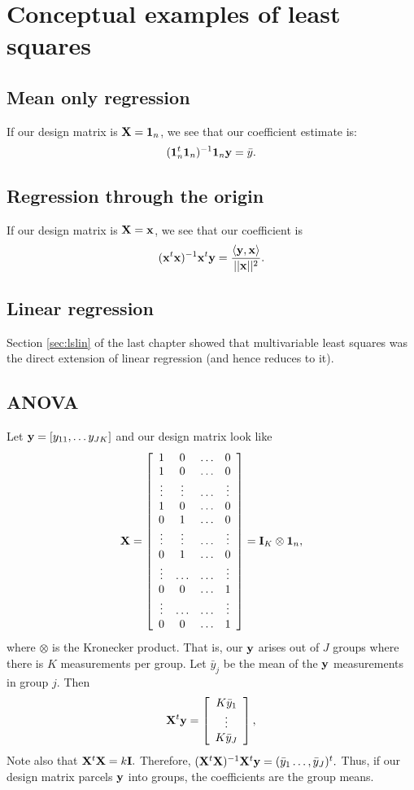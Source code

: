\chapter{Conceptual examples of least squares}

\section{Mean only regression}
If our design matrix is $\mathbf{X} = \mathbf{1}_n$, we see 
that our coefficient estimate is:
$$
(\mathbf{1}_n ^t \mathbf{1}_n)^{-1} \mathbf{1}_n \mathbf{y} = \bar y.
$$

\section{Regression through the origin}
If our design matrix is $\mathbf{X} = \mathbf{x}$, we see
that our coefficient is 
$$
(\mathbf{x}^t\mathbf{x})^{-1}\mathbf{x}^t \mathbf{y}
= \frac{\langle \mathbf{y}, \mathbf{x} \rangle}{||\mathbf{x}||^2}.
$$

\section{Linear regression}
Section \ref{sec:lslin} of the last chapter showed
that multivariable least squares was the direct
extension of linear regression (and hence reduces
to it).

\section{ANOVA}
Let $\mathbf{y} = [y_{11}, \ldots y_{JK}]$ and our design
matrix look like
$$
\mathbf{X} =
\left[
\begin{array}{cccc}
1 & 0  & \ldots & 0 \\
1 & 0  & \ldots & 0 \\
\vdots & \vdots & \ldots  & \vdots \\
1 & 0 & \ldots & 0 \\
0  & 1 & \ldots & 0 \\
\vdots & \vdots & \ldots  & \vdots \\
0  & 1 & \ldots & 0 \\
\vdots & \ldots & \ldots  & \vdots \\
0  & 0 & \ldots & 1 \\
\vdots & \ldots & \ldots  & \vdots \\
0  & 0 & \ldots & 1 \\
\end{array}
\right] = \mathbf{I}_K \otimes \mathbf{1}_n,
$$
where $\otimes$ is the Kronecker product. 
That is, our $\mathbf{y}$ arises out of $J$ groups
where there is $K$ measurements per group. Let
$\bar y_j$ be the mean of the $\mathbf{y}$ measurements
in group $j$. 
Then 
$$
\mathbf{X}^t\mathbf{y} = 
\left[
\begin{array}{c}
K \bar y_1 \\
\vdots \\
K \bar y_J
\end{array}
\right] ,
$$
Note also that 
$\mathbf{X}^t \mathbf{X} = k \mathbf{I}.$ Therefore, $(\mathbf{X}^t \mathbf{X})^{-1} \mathbf{X}^t \mathbf{y} =
(\bar y_1 \ldots, \bar y_J)^t.$ Thus, if 
our design matrix parcels $\mathbf{y}$ into groups,
the coefficients are the group means.



